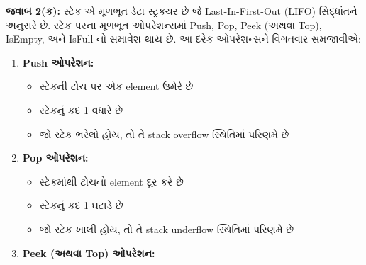 \textbf{જવાબ 2(ક):} સ્ટેક એ મૂળભૂત ડેટા સ્ટ્રક્ચર છે જે Last-In-First-Out (LIFO)
સિદ્ધાંતને અનુસરે છે. સ્ટેક પરના મૂળભૂત ઓપરેશન્સમાં Push, Pop, Peek (અથવા Top),
IsEmpty, અને IsFull નો સમાવેશ થાય છે. આ દરેક ઓપરેશન્સને વિગતવાર સમજાવીએ:

\begin{enumerate}
\def\labelenumi{\arabic{enumi}.}
\tightlist
\item
  \textbf{Push ઓપરેશન:}

  \begin{itemize}
  \tightlist
  \item
    સ્ટેકની ટોચ પર એક element ઉમેરે છે
  \item
    સ્ટેકનું કદ 1 વધારે છે
  \item
    જો સ્ટેક ભરેલો હોય, તો તે stack overflow સ્થિતિમાં પરિણમે છે
  \end{itemize}

\begin{Shaded}
\begin{Highlighting}[]
     \OperatorTok{\textless{}}
    \NormalTok{:}
        \NormalTok{(}\NormalTok{)}
\end{Highlighting}
\end{Shaded}
\item
  \textbf{Pop ઓપરેશન:}

  \begin{itemize}
  \tightlist
  \item
    સ્ટેકમાંથી ટોચનો element દૂર કરે છે
  \item
    સ્ટેકનું કદ 1 ઘટાડે છે
  \item
    જો સ્ટેક ખાલી હોય, તો તે stack underflow સ્થિતિમાં પરિણમે છે
  \end{itemize}

\begin{Shaded}
\begin{Highlighting}[]
     
    \NormalTok{:}
        \NormalTok{(}\NormalTok{)}
         
\end{Highlighting}
\end{Shaded}
\item
  \textbf{Peek (અથવા Top) ઓપરેશન:}


\end{enumerate}

